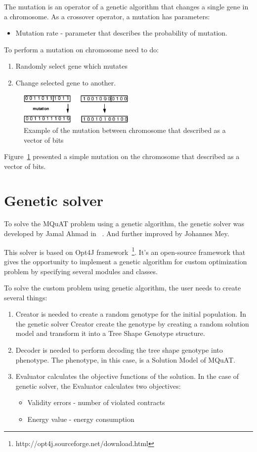 The mutation is an operator of a genetic algorithm that changes a single gene in a chromosome. As a crossover operator, a mutation has parameters:

\begin{itemize}
	\item Mutation rate - parameter that describes the probability of mutation.
\end{itemize}

To perform a mutation on chromosome need to do:
\begin{enumerate}
	\item Randomly select gene which mutates
	\item Change selected gene to another.
\end{enumerate}
\begin{figure}
	\centering
	\includegraphics[width=0.5\textwidth]{images/MutationVector.png}
	\caption[Example of the mutation]{Example of the mutation between chromosome that described as a vector of bits}
	\label{fig:MutationVector}
\end{figure}
Figure~\ref{fig:MutationVector} presented a simple mutation on the chromosome that described as a vector of bits.




\section{Genetic solver}
To solve the MQuAT problem using a genetic algorithm, the genetic solver was developed by Jamal Ahmad in ~\cite{ahmad18}. And further improved by Johannes Mey.

This solver is based on Opt4J framework~\footnote{http://opt4j.sourceforge.net/download.html}. It's an open-source framework that gives the opportunity to implement a genetic algorithm for custom optimization problem by specifying several modules and classes.

To solve the custom problem using genetic algorithm, the user needs to create several things:
\begin{enumerate}
	\item Creator is needed to create a random genotype for the initial population.
	In the genetic solver Creator create the genotype by creating a random solution model and transform it into a Tree Shape Genotype structure.
	\item Decoder is needed to perform decoding the tree shape genotype into phenotype. The phenotype, in this case, is a Solution Model of MQuAT.
	\item Evaluator calculates the objective functions of the solution. In the case of genetic solver, the Evaluator calculates two objectives: 
	\begin{itemize}
		\item Validity errors - number of violated contracts
		\item Energy value - energy consumption
	\end{itemize}
\end{enumerate}

